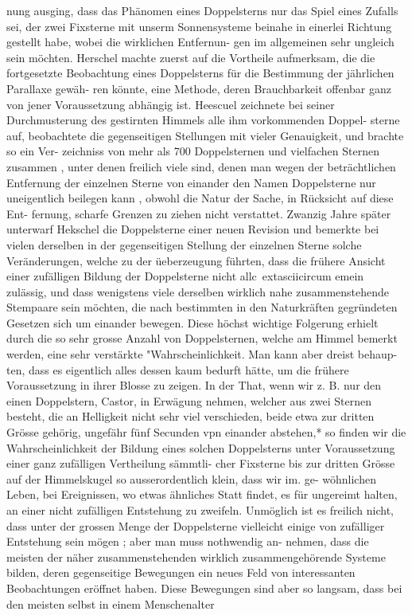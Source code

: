 \documentclass[12pt,a4paper]{article}
\begin{document}
{{{{{{{{nung  ausging,  dass  das  Phänomen  eines  Doppelsterns  nur  das  Spiel  eines  Zufalls  sei,  der  zwei  Fixsterne mit  unserm  Sonnensysteme  beinahe  in  einerlei  Richtung  gestellt  habe,  wobei  die  wirklichen  Entfernun- gen im  allgemeinen  sehr  ungleich  sein  möchten.  Herschel  machte  zuerst  auf  die  Vortheile  aufmerksam, die  die  fortgesetzte  Beobachtung  eines  Doppelsterns  für  die  Bestimmung  der  jährlichen  Parallaxe  gewäh- ren könnte,  eine  Methode,  deren  Brauchbarkeit  offenbar  ganz  von  jener  Voraussetzung  abhängig  ist. Heescuel  zeichnete  bei  seiner  Durchmusterung  des  gestirnten  Himmels  alle  ihm  vorkommenden  Doppel- sterne auf,  beobachtete  die  gegenseitigen  Stellungen  mit  vieler  Genauigkeit,  und  brachte  so  ein  Ver- zeichniss  von  mehr  als  700  Doppelsternen  und  vielfachen  Sternen  zusammen ,  unter  denen  freilich  viele sind,  denen  man  wegen  der  beträchtlichen  Entfernung  der  einzelnen  Sterne  von  einander  den  Namen Doppelsterne  nur  uneigentlich  beilegen  kann ,  obwohl  die  Natur  der  Sache,  in  Rücksicht  auf  diese  Ent- fernung, scharfe  Grenzen  zu  ziehen  nicht  verstattet. Zwanzig  Jahre  später  unterwarf  Hekschel  die  Doppelsterne  einer  neuen  Revision  und  bemerkte bei  vielen  derselben  in  der  gegenseitigen  Stellung  der  einzelnen  Sterne  solche  Veränderungen,  welche zu  der  üeberzeugung  führten,  dass  die  frühere  Ansicht  einer  zufälligen  Bildung  der  Doppelsterne  nicht allc\	extasciicircum{}{ }emein  zulässig,  und  dass  wenigstens  viele  derselben  wirklich  nahe  zusammenstehende  Stempaare  sein möchten,  die  nach  bestimmten  in  den  Naturkräften  gegründeten  Gesetzen  sich  um  einander  bewegen. Diese  höchst  wichtige  Folgerung  erhielt  durch  die  so  sehr  grosse  Anzahl  von  Doppelsternen,  welche am  Himmel  bemerkt  werden,  eine  sehr  verstärkte  "Wahrscheinlichkeit.  Man  kann  aber  dreist  behaup- ten, dass  es  eigentlich  alles  dessen  kaum  bedurft  hätte,  um  die  frühere  Voraussetzung  in  ihrer  Blosse zu  zeigen.  In  der  That,  wenn  wir  z.  B.  nur  den  einen  Doppelstern,  Castor,  in  Erwägung  nehmen, welcher  aus  zwei  Sternen  besteht,  die  an  Helligkeit  nicht  sehr  viel  verschieden,  beide  etwa  zur  dritten Grösse  gehörig,  ungefähr  fünf  Secunden  vpn  einander  abstehen,*  so  finden  wir  die  Wahrscheinlichkeit der  Bildung  eines  solchen  Doppelsterns  unter  Voraussetzung  einer  ganz  zufälligen  Vertheilung  sämmtli- cher  Fixsterne  bis  zur  dritten  Grösse  auf  der  Himmelskugel  so  ausserordentlich  klein,  dass  wir  im. ge- wöhnlichen Leben,  bei  Ereignissen,  wo  etwas  ähnliches  Statt  findet,  es  für  ungereimt  halten,  an  einer nicht  zufälligen  Entstehung  zu  zweifeln.  Unmöglich  ist  es  freilich  nicht,  dass  unter  der  grossen  Menge der  Doppelsterne  vielleicht  einige  von  zufälliger  Entstehung  sein  mögen ;  aber  man  muss  nothwendig  an- nehmen, dass  die  meisten  der  näher  zusammenstehenden  wirklich  zusammengehörende  Systeme  bilden, deren  gegenseitige  Bewegungen  ein  neues  Feld  von  interessanten  Beobachtungen  eröffnet  haben.  Diese Bewegungen  sind  aber  so  langsam,  dass  bei  den  meisten  selbst  in  einem  Menschenalter  }}}}}}}}
\end{document}
